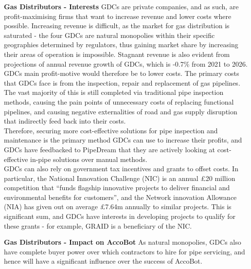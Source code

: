 \documentclass[11pt]{article}		%
\begin{document}
	    \textbf{Gas Distributors - Interests}
	    GDCs are private companies, and as such, are profit-maximising firms that want to increase revenue and lower costs where possible. Increasing revenue is difficult, as the market for gas distribution is saturated - the four GDCs are natural monopolies within their specific geographies determined by regulators, thus gaining market share by increasing their areas of operation is impossible. Stagnant revenue is also evident from projections of annual revenue growth of GDCs, which is -0.7\% from 2021 to 2026.
        \\ \hspace*{3ex}GDCs main profit-motive would therefore be to lower costs. The primary costs that GDCs face is from the inspection, repair and replacement of gas pipelines. The vast majority of this is still completed via traditional pipe inspection methods, causing the pain points of unnecessary costs of replacing functional pipelines, and causing negative externalities of road and gas supply disruption that indirectly feed back into their costs. 
        \\ \hspace*{3ex}Therefore, securing more cost-effective solutions for pipe inspection and maintenance is the primary method GDCs can use to increase their profits, and GDCs have feedbacked to PipeDream that they are actively looking at cost-effective in-pipe solutions over manual methods. 
        \\ \hspace*{3ex}GDCs can also rely on government tax incentives and grants to offset costs. In particular, the National Innovation Challenge (NIC) is an annual £20 million competition that “funds flagship innovative projects to deliver financial and environmental benefits for customers”, and the Network innovation Allowance (NIA) has given out on average £7.64m annually to similar projects. This is significant sum, and GDCs have interests in developing projects to qualify for these grants - for example, GRAID is a beneficiary of the NIC.  
        
        \textbf{Gas Distributors - Impact on AccoBot}
        As natural monopolies, GDCs also have complete buyer power over which contractors to hire for pipe servicing, and hence will have a significant influence over the success of AccoBot. 
        
\end{document}
